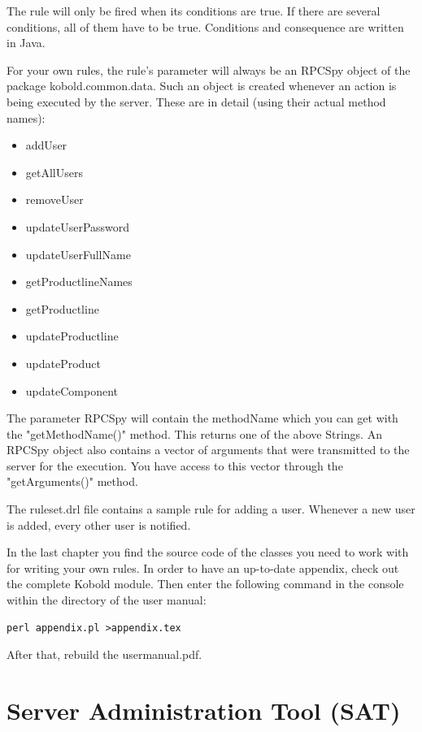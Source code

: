 The rule will only be fired when its conditions are true. If there are several conditions,
all of them have to be true. Conditions and consequence are written in Java.\par

For your own rules, the rule's parameter will always be an RPCSpy object of the package
kobold.common.data. Such an object is created whenever an action is being executed by the server.
These are in detail (using their actual method names):
\begin{itemize}
	\item addUser
	\item getAllUsers
	\item removeUser
	\item updateUserPassword
	\item updateUserFullName
	\item getProductlineNames
	\item getProductline
	\item updateProductline
	\item updateProduct
	\item updateComponent
\end{itemize}
The parameter RPCSpy will contain the methodName which you can get with the "getMethodName()" method. 
This returns one of the above Strings. An RPCSpy object also contains a vector of
arguments that were transmitted to the server for the execution. You have access to this vector through
the "getArguments()" method. \par
The ruleset.drl file contains a sample rule for adding a user. Whenever a new user is added, every other user
is notified. \par
In the last chapter you find the source code of the classes you need to work with for writing your own rules.
In order to have an up-to-date appendix, check out the complete Kobold module. 
Then enter the following command in the console within the directory of the user manual:

\begin{verbatim}
perl appendix.pl >appendix.tex
\end{verbatim}

After that, rebuild the usermanual.pdf.





\section{Server Administration Tool (SAT)}

